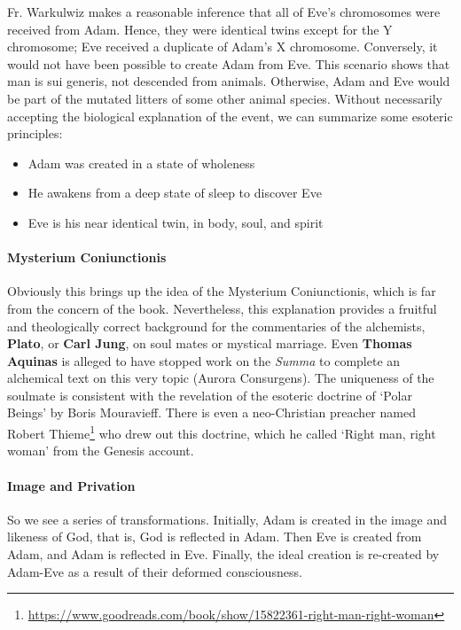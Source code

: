 Fr. Warkulwiz makes a reasonable inference that all of Eve's chromosomes were received from Adam. Hence, they were identical twins except for the Y chromosome; Eve received a duplicate of Adam's X chromosome. Conversely, it would not have been possible to create Adam from Eve. This scenario shows that man is sui generis, not descended from animals. Otherwise, Adam and Eve would be part of the mutated litters of some other animal species. Without necessarily accepting the biological explanation of the event, we can summarize some esoteric principles:

\begin{itemize}


\item Adam was created in a state of wholeness

\item He awakens from a deep state of sleep to discover Eve

\item Eve is his near identical twin, in body, soul, and spirit
\end{itemize}


\paragraph{Mysterium Coniunctionis}


Obviously this brings up the idea of the Mysterium Coniunctionis, which is far from the concern of the book. Nevertheless, this explanation provides a fruitful and theologically correct background for the commentaries of the alchemists, \textbf{Plato}, or \textbf{Carl Jung}, on soul mates or mystical marriage. Even \textbf{Thomas Aquinas} is alleged to have stopped work on the \emph{Summa} to complete an alchemical text on this very topic (Aurora Consurgens). The uniqueness of the soulmate is consistent with the revelation of the esoteric doctrine of `Polar Beings' by Boris Mouravieff. There is even a neo-Christian preacher named Robert Thieme\footnote{\url{https://www.goodreads.com/book/show/15822361-right-man-right-woman}} who drew out this doctrine, which he called `Right man, right woman' from the Genesis account.

\paragraph{Image and Privation}


So we see a series of transformations. Initially, Adam is created in the image and likeness of God, that is, God is reflected in Adam. Then Eve is created from Adam, and Adam is reflected in Eve. Finally, the ideal creation is re-created by Adam-Eve as a result of their deformed consciousness.

